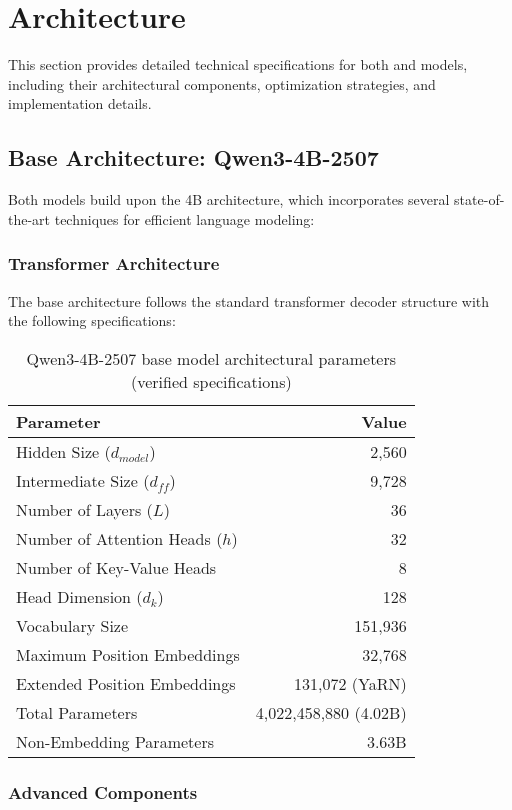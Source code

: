 \section{Architecture}
\label{sec:architecture}

This section provides detailed technical specifications for both \supra{} and \zennano{} models, including their architectural components, optimization strategies, and implementation details.

\subsection{Base Architecture: Qwen3-4B-2507}

Both models build upon the \qwen{} 4B architecture, which incorporates several state-of-the-art techniques for efficient language modeling:

\subsubsection{Transformer Architecture}
The base architecture follows the standard transformer decoder structure with the following specifications:

\begin{table}[H]
\centering
\begin{tabular}{lr}
\toprule
Parameter & Value \\
\midrule
Hidden Size ($d_{model}$) & 2,560 \\
Intermediate Size ($d_{ff}$) & 9,728 \\
Number of Layers ($L$) & 36 \\
Number of Attention Heads ($h$) & 32 \\
Number of Key-Value Heads & 8 \\
Head Dimension ($d_k$) & 128 \\
Vocabulary Size & 151,936 \\
Maximum Position Embeddings & 32,768 \\
Extended Position Embeddings & 131,072 (YaRN) \\
Total Parameters & 4,022,458,880 (4.02B) \\
Non-Embedding Parameters & 3.63B \\
\bottomrule
\end{tabular}
\caption{Qwen3-4B-2507 base model architectural parameters (verified specifications)}
\label{tab:base-architecture}
\end{table}

\subsubsection{Advanced Components}


